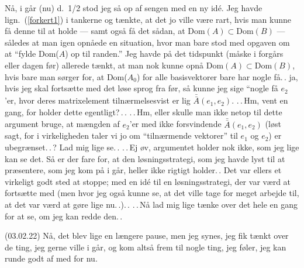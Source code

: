 \documentclass{report}
\begin{document}
Nå, i går (nu) d.\ 1/2 stod jeg så op af sengen med en ny idé. Jeg havde lign.\ (\ref{forkert1}) i tankerne og tænkte, at det jo ville være rart, hvis man kunne få denne til at holde --- samt også få det sådan, at $\mathrm{Dom}(A)\subset\mathrm{Dom}(B)$ --- således at man igen opnåede en situation, hvor man bare stod med opgaven om at ``fylde Dom($A$) op til randen.'' Jeg havde på det tidspunkt (måske i forgårs eller dagen før) allerede tænkt, at man nok kunne opnå $\mathrm{Dom}(A)\subset\mathrm{Dom}(B)$, hvis bare man sørger for, at Dom($A_0$) for alle basisvektorer bare har nogle få.\,. ja, hvis jeg skal fortsætte med det løse sprog fra før, så kunne jeg sige ``nogle få $e_2$'er, hvor deres matrixelement tilnærmelsesvist er lig $\bar{\bar{A}}(e_1, e_2)$. .\,.\,Hm, vent en gang, for holder dette egentligt?\,.\,. .\,.\,Hm, eller skulle man ikke netop til dette argument bruge, at mængden af $e_2$'er med ikke forsvindende $\bar{\bar{A}}(e_1, e_2)$ (løst sagt, for i virkeligheden taler vi jo om ``tilnærmende vektorer'' til $e_1$ og $e_2$) er ubegrænset.\,.\,? Lad mig lige se.\,. .\,.\,Ej øv, argumentet holder nok ikke, som jeg lige kan se det. Så er der fare for, at den løsningsstrategi, som jeg havde lyst til at præsentere, som jeg kom på i går, heller ikke rigtigt holder.\,. Det var ellers et virkeligt godt sted at stoppe; med en idé til en løsningsstrategi, der var værd at fortsætte med (men hvor jeg også kunne se, at det ville tage for meget arbejde til, at det var værd at gøre lige nu.\,.).\,. .\,.\,Nå lad mig lige tænke over det hele en gang for at se, om jeg kan redde den.\,. 

(03.02.22) Nå, det blev lige en længere pause, men jeg synes, jeg fik tænkt over de ting, jeg gerne ville i går, og kom altså frem til nogle ting, jeg føler, jeg kan runde godt af med for nu. 
\end{document}
